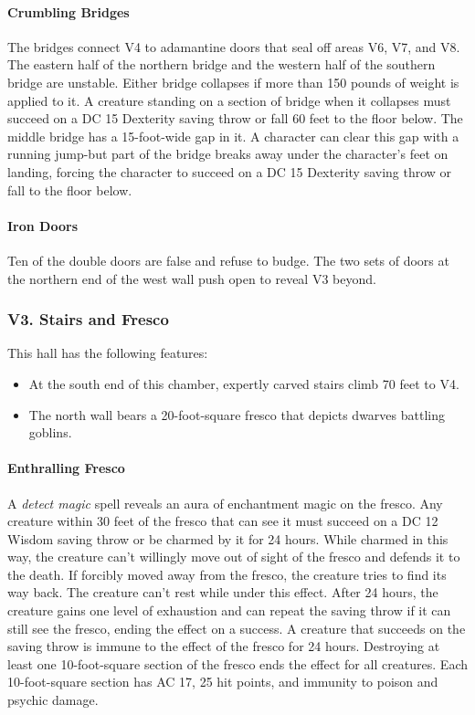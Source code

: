 \documentclass[10pt,a4paper,twoside,twocolumn,openany,nodeprecatedcode]{dndbook}
\begin{document}
\paragraph{Crumbling Bridges}
The bridges connect V4 to adamantine doors that seal off areas V6, V7, and V8. The eastern half of the northern bridge and the western half of the southern bridge are unstable. Either bridge collapses if more than 150 pounds of weight is applied to it. A creature standing on a section of bridge when it collapses must succeed on a DC 15 Dexterity saving throw or fall 60 feet to the floor below.
The middle bridge has a 15-foot-wide gap in it. A character can clear this gap with a running jump-but part of the bridge breaks away under the character's feet on landing, forcing the character to succeed on a DC 15 Dexterity saving throw or fall to the floor below.
\paragraph{Iron Doors}
Ten of the double doors are false and refuse to budge. The two sets of doors at the northern end of the west wall push open to reveal V3 beyond.
\subsubsection{V3. Stairs and Fresco}
This hall has the following features:
\begin{itemize}

\item At the south end of this chamber, expertly carved stairs climb 70 feet to V4.
\item The north wall bears a 20-foot-square fresco that depicts dwarves battling goblins.
\end{itemize}


\paragraph{Enthralling Fresco}
A \textit{detect magic} spell reveals an aura of enchantment magic on the fresco. Any creature within 30 feet of the fresco that can see it must succeed on a DC 12 Wisdom saving throw or be charmed by it for 24 hours. While charmed in this way, the creature can't willingly move out of sight of the fresco and defends it to the death. If forcibly moved away from the fresco, the creature tries to find its way back. The creature can't rest while under this effect. After 24 hours, the creature gains one level of exhaustion and can repeat the saving throw if it can still see the fresco, ending the effect on a success. A creature that succeeds on the saving throw is immune to the effect of the fresco for 24 hours. Destroying at least one 10-foot-square section of the fresco ends the effect for all creatures. Each 10-foot-square section has AC 17, 25 hit points, and immunity to poison and psychic damage.
\end{document}
